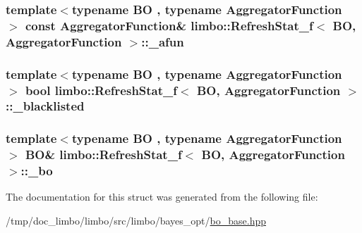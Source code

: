 \subsubsection[{\+\_\+afun}]{\setlength{\rightskip}{0pt plus 5cm}template$<$typename B\+O , typename Aggregator\+Function $>$ const Aggregator\+Function\& {\bf limbo\+::\+Refresh\+Stat\+\_\+f}$<$ B\+O, Aggregator\+Function $>$\+::\+\_\+afun}\label{structlimbo_1_1_refresh_stat__f_af02fdc84a4066c199d26e823b9887531}
\hypertarget{structlimbo_1_1_refresh_stat__f_aa4cc189ccbdbcd4d3cbefa54fae1f9f3}{}
\subsubsection[{\+\_\+blacklisted}]{\setlength{\rightskip}{0pt plus 5cm}template$<$typename B\+O , typename Aggregator\+Function $>$ bool {\bf limbo\+::\+Refresh\+Stat\+\_\+f}$<$ B\+O, Aggregator\+Function $>$\+::\+\_\+blacklisted}\label{structlimbo_1_1_refresh_stat__f_aa4cc189ccbdbcd4d3cbefa54fae1f9f3}
\hypertarget{structlimbo_1_1_refresh_stat__f_ad94ccf3c46dbed8e9f8ab573af8fb258}{}
\subsubsection[{\+\_\+bo}]{\setlength{\rightskip}{0pt plus 5cm}template$<$typename B\+O , typename Aggregator\+Function $>$ B\+O\& {\bf limbo\+::\+Refresh\+Stat\+\_\+f}$<$ B\+O, Aggregator\+Function $>$\+::\+\_\+bo}\label{structlimbo_1_1_refresh_stat__f_ad94ccf3c46dbed8e9f8ab573af8fb258}


The documentation for this struct was generated from the following file\+:\begin{DoxyCompactItemize}
\item 
/tmp/doc\+\_\+limbo/limbo/src/limbo/bayes\+\_\+opt/\hyperlink{bo__base_8hpp}{bo\+\_\+base.\+hpp}\end{DoxyCompactItemize}
